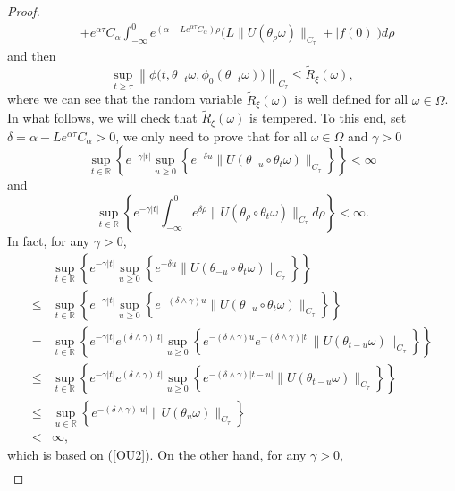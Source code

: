 \documentclass[preprint,12pt]{elsarticle}
\begin{document}
\begin{proof}
\begin{align}
&+e^{\alpha\tau}C_\alpha\int_{-\infty}^0e^{(\alpha-Le^{\alpha\tau}C_\alpha)\rho}\bigl(L\|U(\theta_{\rho}\omega)\|_{C_\tau}+|f(0)|\bigr)d\rho
\end{align}
and then
\begin{equation}\label{eq33-1}
\sup_{t\geq\tau}\left\|\phi\bigl(t,\theta_{-t}\omega,\phi_0(\theta_{-t}\omega)\bigr)\right\|_{C_\tau}\leq\widetilde{R}_\xi(\omega),
\end{equation}
where we can see that the random variable $\widetilde{R}_\xi(\omega)$ is well defined for all $\omega\in\Omega$. In what follows, we will check that $\widetilde{R}_\xi(\omega)$ is tempered. To this end, set $\delta=\alpha-Le^{\alpha\tau}C_\alpha>0$, we only need to prove that for all $\omega\in\Omega$ and $\gamma>0$
\begin{equation}\label{eq34}
\sup_{t\in\mathbb{R}}
\left\{e^{-\gamma|t|}\sup_{u\geq0}\left\{e^{-\delta u}\|U(\theta_{-u}\circ\theta_t\omega)\|_{C_\tau}\right\}\right\}<\infty\end{equation}
and
\begin{equation}\label{eq35}\sup_{t\in\mathbb{R}}
\left\{e^{-\gamma|t|}\int_{-\infty}^0e^{\delta\rho}\|U(\theta_{\rho}\circ\theta_t\omega)\|_{C_\tau}d\rho\right\}<\infty.\end{equation}
In fact, for any $\gamma>0$,
\begin{align}\label{eq36}
&\sup_{t\in\mathbb{R}}\left\{e^{-\gamma|t|}\sup_{u\geq0}\left\{e^{-\delta u}\|U(\theta_{-u}\circ\theta_t\omega)\|_{C_\tau}\right\}\right\}\nonumber\\
\leq&\sup_{t\in\mathbb{R}}\left\{e^{-\gamma|t|}\sup_{u\geq0}\left\{e^{-(\delta\wedge\gamma)u}\|U(\theta_{-u}\circ\theta_t\omega)\|_{C_\tau}\right\}\right\}\nonumber\\
=&\sup_{t\in\mathbb{R}}\left\{e^{-\gamma|t|}e^{(\delta\wedge\gamma)|t|}\sup_{u\geq0}\left\{e^{-(\delta\wedge\gamma)u}e^{-(\delta\wedge\gamma)|t|}\|U(\theta_{t-u}\omega)\|_{C_\tau}\right\}\right\}\nonumber\\
\leq&\sup_{t\in\mathbb{R}}\left\{e^{-\gamma|t|}e^{(\delta\wedge\gamma)|t|}\sup_{u\geq0}\left\{e^{-(\delta\wedge\gamma)|t-u|}\|U(\theta_{t-u}\omega)\|_{C_\tau}\right\}\right\}\nonumber\\
\leq&\sup_{u\in\mathbb{R}}\left\{e^{-(\delta\wedge\gamma)|u|}\|U(\theta_{u}\omega)\|_{C_\tau}\right\}\nonumber\\
<&\infty,
\end{align}
which is based on (\ref{OU2}). On the other hand, for any $\gamma>0$,
\begin{align}\label{eq37}

\end{align}
\end{proof}
\end{document}
